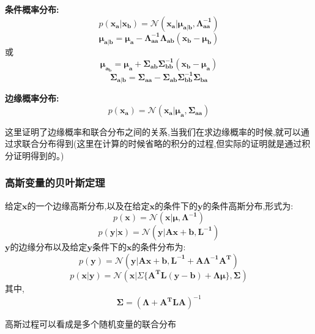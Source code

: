\documentclass[UTF8,a4paper]{ctexart}
\begin{document}
            \textbf{条件概率分布:}
            \begin{equation}
                p(\bm{x_a}|\bm{x_b}) = \mathcal{N}(\bm{x_a}|\bm{\mu_{a|b}},\bm{\Lambda_{aa}^{-1}})
            \end{equation}
            \begin{equation}
                \bm{\mu_{a|b}} = \bm{\mu_a} - \bm{\Lambda_{aa}^{-1}\Lambda_{ab}(x_b - \mu_b)}
            \end{equation}
            或
            \begin{equation}
                \bm{\mu_{a_b}} = \bm{\mu_a + \Sigma_{ab}\Sigma_{bb}^{-1}(x_b - \mu_a)}
            \end{equation}
            \begin{equation}
                \bm{\Sigma_{a|b}= \Sigma_{aa} - \Sigma_{ab}\Sigma_{bb}^{-1}\Sigma_{ba}}
            \end{equation}

            \textbf{边缘概率分布:}
            \begin{equation}
                p(\bm{x_a}) = \mathcal{N}(\bm{x_a|\mu_a,\Sigma_{aa}})
            \end{equation}

            {\color{blue}这里证明了边缘概率和联合分布之间的关系,当我们在求边缘概率的时候,就可以通过求联合分布得到(这里在计算的时候省略的积分的过程,但实际的证明就是通过积分证明得到的。)}

            \subsubsection{高斯变量的贝叶斯定理}

            给定$\bm{x}$的一个边缘高斯分布,以及在给定$\bm{x}$的条件下的$\bm{y}$的条件高斯分布,形式为:
            \begin{equation}
                p(\bm{x}) = \mathcal{N}(\bm{x}|\bm{\mu},\bm{\Lambda^{-1}})
            \end{equation}
            \begin{equation}
                p(\bm{y}|\bm{x}) = \mathcal{N}(\bm{y}|\bm{Ax + b,L^{-1}})
            \end{equation}
            $\bm{y}$的边缘分布以及给定$\bm{y}$条件下的$\bm{x}$的条件分布为:
            \begin{equation}
                p(\bm{y}) = \mathcal{N}(\bm{y}|\bm{Ax + b,L^{-1} + A\Lambda^{-1}A^{T}})
            \end{equation}
            \begin{equation}
                p(\bm{x|y}) = \mathcal{N}(\bm{x}|\Sigma\{\bm{A^TL(y-b)+\Lambda\mu}\},\bm{\Sigma})
            \end{equation}
            其中,
            \begin{equation}
                \bm{\Sigma} = (\bm{\Lambda + A^TLA})^{-1}
            \end{equation}

            {\color{red}高斯过程可以看成是多个随机变量的联合分布}
\end{document}
